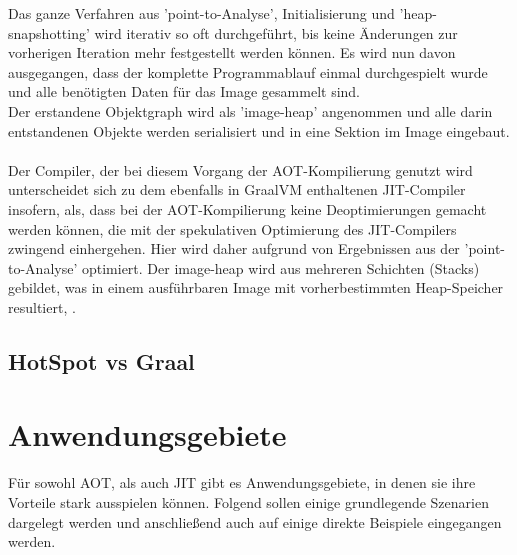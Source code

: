 Das ganze Verfahren aus 'point-to-Analyse', Initialisierung und 'heap-snapshotting' wird iterativ so oft durchgeführt, bis keine Änderungen zur vorherigen Iteration mehr festgestellt werden können. Es wird nun davon ausgegangen, dass der komplette Programmablauf einmal durchgespielt wurde und alle benötigten Daten für das Image gesammelt sind.\\
Der erstandene Objektgraph wird als 'image-heap' angenommen und alle darin entstandenen Objekte werden serialisiert und in eine Sektion im Image eingebaut. \\
\\
Der Compiler, der bei diesem Vorgang der \ac{AOT}-Kompilierung genutzt wird unterscheidet sich zu dem ebenfalls in GraalVM enthaltenen \ac{JIT}-Compiler insofern, als, dass bei der \ac{AOT}-Kompilierung keine Deoptimierungen gemacht werden können, die mit der spekulativen Optimierung des \ac{JIT}-Compilers zwingend einhergehen. Hier wird daher aufgrund von Ergebnissen aus der 'point-to-Analyse' optimiert. Der image-heap wird aus mehreren Schichten (Stacks) gebildet, was in einem ausführbaren Image mit vorherbestimmten Heap-Speicher resultiert, \cite[vgl. Sipek 2020, S.3]{Sipek_2020}.

\subsection{HotSpot vs Graal}

\section{Anwendungsgebiete}
Für sowohl \ac{AOT}, als auch \ac{JIT} gibt es Anwendungsgebiete, in denen sie ihre Vorteile stark ausspielen können. Folgend sollen einige grundlegende Szenarien dargelegt werden und anschließend auch auf einige direkte Beispiele eingegangen werden. 

